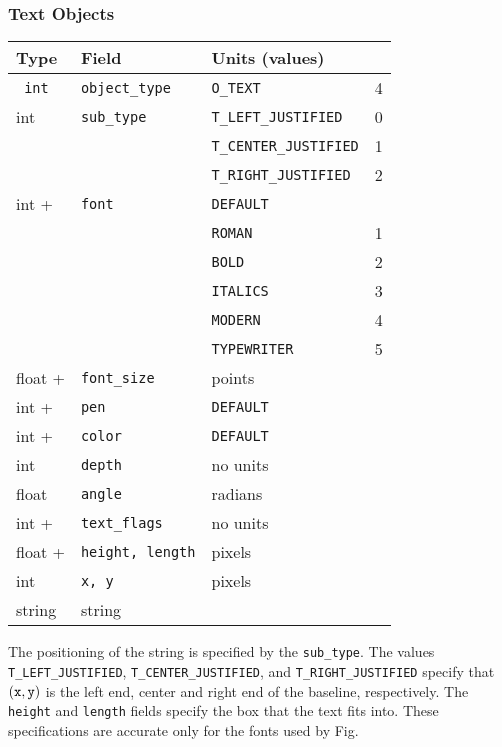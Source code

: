 \subsubsection{Text Objects}

\begin{center}
\begin{tabular}{|l|l|ll|}
\hline
Type 	& Field			& Units (values) 		&	\\ \hline
\hline
\tt
int	& {\tt object\_type}	& {\tt O\_TEXT}			& 4	\\ \hline
%
int	& {\tt sub\_type}	& {\tt T\_LEFT\_JUSTIFIED}	& 0	\\
	&			& {\tt T\_CENTER\_JUSTIFIED}	& 1	\\
	&			& {\tt T\_RIGHT\_JUSTIFIED}	& 2	\\
									\hline
%
int +	& {\tt font}		& {\tt DEFAULT}		& 	\\
	&			& {\tt ROMAN}		& 1	\\
	&			& {\tt BOLD}		& 2	\\
	&			& {\tt ITALICS}		& 3	\\
	&			& {\tt MODERN}		& 4	\\
	&			& {\tt TYPEWRITER}	& 5	\\ \hline
%
float +	& {\tt font\_size}	& points		&	\\ \hline
%
int +	& {\tt pen}		& {\tt DEFAULT}		&	\\ \hline
%
int +	& {\tt color}		& {\tt DEFAULT}		&	\\ \hline
%
int  	& {\tt depth}		& no units		&	\\ \hline
%
float	& {\tt angle}		& radians		&	\\ \hline
%
int +	& {\tt text\_flags}	& no units		&	\\ \hline
%
float +	& {\tt height, length}	& pixels		&	\\ \hline
%
int	& {\tt x, y}		& pixels		&	\\ \hline
%
string	& string		& 			&	\\ \hline
\end{tabular}
\end{center}
%
The positioning of the string is specified by the {\tt sub\_type}.
The values {\tt T\_LEFT\_JUSTIFIED}, {\tt T\_CENTER\_JUSTIFIED},
	and {\tt T\_RIGHT\_JUSTIFIED} specify that 
	$({\tt x}, {\tt y})$ is the left end, center and right end
	 of the baseline, respectively.
The {\tt height} and {\tt length} fields specify the box that the
	text fits into.
These specifications are accurate only for the fonts used by Fig.

